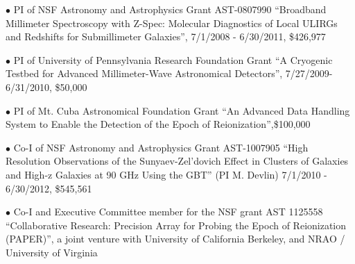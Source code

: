 {
 
} 
\begin{description}
\parskip0pt
\item
$\bullet$ PI of NSF Astronomy and Astrophysics Grant AST-0807990 ``Broadband Millimeter
Spectroscopy with Z-Spec: Molecular Diagnostics of Local ULIRGs and
Redshifts for Submillimeter Galaxies'', 7/1/2008 - 6/30/2011, \$426,977

\item
$\bullet$ PI of University of Pennsylvania Research Foundation Grant ``A
Cryogenic Testbed for Advanced Millimeter-Wave Astronomical
Detectors'', 7/27/2009- 6/31/2010, \$50,000

\item 
$\bullet$ PI of Mt. Cuba Astronomical Foundation Grant ``An Advanced Data
Handling System to Enable the Detection of the Epoch of
Reionization'',\$100,000

\item
$\bullet$ Co-I of NSF Astronomy and Astrophysics Grant AST-1007905 ``High Resolution
Observations of the Sunyaev-Zel'dovich Effect in Clusters of Galaxies
and High-z Galaxies at 90 GHz Using the GBT'' (PI M. Devlin) 7/1/2010
- 6/30/2012, \$545,561

\item
$\bullet$ Co-I and Executive Committee member for the NSF grant AST 1125558 ``Collaborative Research: Precision Array for Probing the Epoch of Reionization (PAPER)'', a joint venture with University of California Berkeley, and NRAO / University of Virginia


\end{description}

